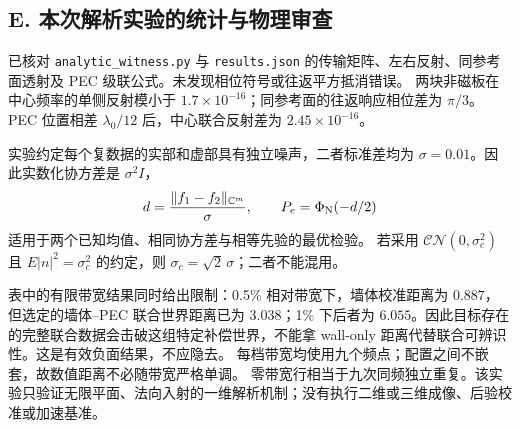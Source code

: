 \subsection*{E. 本次解析实验的统计与物理审查}

已核对 \texttt{analytic\_witness.py} 与 \texttt{results.json} 的传输矩阵、左右反射、同参考面透射及 PEC 级联公式。未发现相位符号或往返平方抵消错误。
两块非磁板在中心频率的单侧反射模小于 $1.7\times10^{-16}$；同参考面的往返响应相位差为 $\pi/3$。
PEC 位置相差 $\lambda_0/12$ 后，中心联合反射差为 $2.45\times10^{-16}$。

实验约定每个复数据的实部和虚部具有独立噪声，二者标准差均为
$\sigma=0.01$。因此实数化协方差是 $\sigma^2I$，
\[
 d=\frac{\lVert f_1-f_2\rVert_{\mathbb C^m}}{\sigma},
 \qquad P_e=\Phi_{\rm N}(-d/2)
\]
适用于两个已知均值、相同协方差与相等先验的最优检验。
若采用 $\mathcal{CN}(0,\sigma_c^2)$ 且 $E|n|^2=\sigma_c^2$ 的约定，则
$\sigma_c=\sqrt2\,\sigma$；二者不能混用。

表中的有限带宽结果同时给出限制：0.5\% 相对带宽下，墙体校准距离为
$0.887$，但选定的墙体--PEC 联合世界距离已为 $3.038$；1\% 下后者为
$6.055$。因此目标存在的完整联合数据会击破这组特定补偿世界，不能拿
wall-only 距离代替联合可辨识性。这是有效负面结果，不应隐去。
每档带宽均使用九个频点；配置之间不嵌套，故数值距离不必随带宽严格单调。
零带宽行相当于九次同频独立重复。该实验只验证无限平面、法向入射的一维解析机制；没有执行二维或三维成像、后验校准或加速基准。
